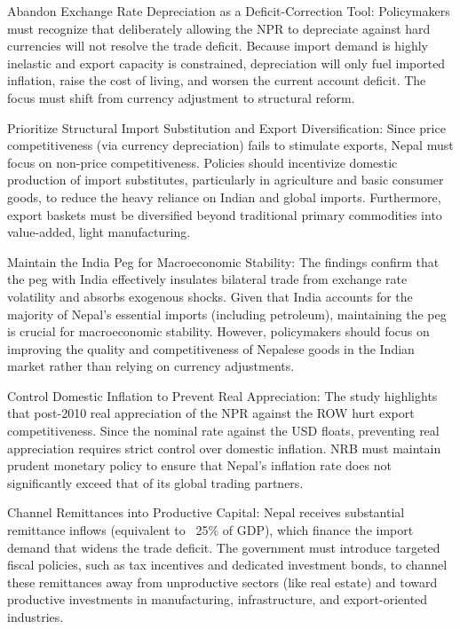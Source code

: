 \documentclass[12pt]{article}
\begin{document}
Abandon Exchange Rate Depreciation as a Deficit-Correction Tool: Policymakers must recognize that deliberately allowing the NPR to depreciate against hard currencies will not resolve the trade deficit. Because import demand is highly inelastic and export capacity is constrained, depreciation will only fuel imported inflation, raise the cost of living, and worsen the current account deficit. The focus must shift from currency adjustment to structural reform.

Prioritize Structural Import Substitution and Export Diversification: Since price competitiveness (via currency depreciation) fails to stimulate exports, Nepal must focus on non-price competitiveness. Policies should incentivize domestic production of import substitutes, particularly in agriculture and basic consumer goods, to reduce the heavy reliance on Indian and global imports. Furthermore, export baskets must be diversified beyond traditional primary commodities into value-added, light manufacturing.

Maintain the India Peg for Macroeconomic Stability: The findings confirm that the peg with India effectively insulates bilateral trade from exchange rate volatility and absorbs exogenous shocks. Given that India accounts for the majority of Nepal's essential imports (including petroleum), maintaining the peg is crucial for macroeconomic stability. However, policymakers should focus on improving the quality and competitiveness of Nepalese goods in the Indian market rather than relying on currency adjustments.

Control Domestic Inflation to Prevent Real Appreciation: The study highlights that post-2010 real appreciation of the NPR against the ROW hurt export competitiveness. Since the nominal rate against the USD floats, preventing real appreciation requires strict control over domestic inflation. NRB must maintain prudent monetary policy to ensure that Nepal’s inflation rate does not significantly exceed that of its global trading partners.

Channel Remittances into Productive Capital: Nepal receives substantial remittance inflows (equivalent to ~25\% of GDP), which finance the import demand that widens the trade deficit. The government must introduce targeted fiscal policies, such as tax incentives and dedicated investment bonds, to channel these remittances away from unproductive sectors (like real estate) and toward productive investments in manufacturing, infrastructure, and export-oriented industries.
\end{document}
